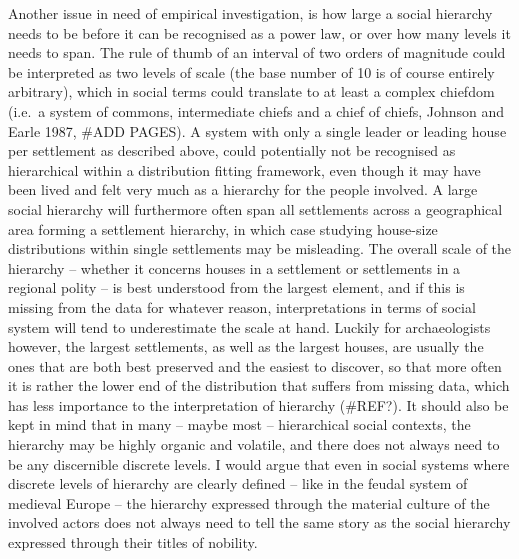 \documentclass[
  12pt,
]{book}
\begin{document}
Another issue in need of empirical investigation, is how large a social hierarchy needs to be before it can be recognised as a power law, or over how many levels it needs to span. The rule of thumb of an interval of two orders of magnitude could be interpreted as two levels of scale (the base number of 10 is of course entirely arbitrary), which in social terms could translate to at least a complex chiefdom (i.e.~a system of commons, intermediate chiefs and a chief of chiefs, Johnson and Earle 1987, \#ADD PAGES). A system with only a single leader or leading house per settlement as described above, could potentially not be recognised as hierarchical within a distribution fitting framework, even though it may have been lived and felt very much as a hierarchy for the people involved. A large social hierarchy will furthermore often span all settlements across a geographical area forming a settlement hierarchy, in which case studying house-size distributions within single settlements may be misleading. The overall scale of the hierarchy -- whether it concerns houses in a settlement or settlements in a regional polity -- is best understood from the largest element, and if this is missing from the data for whatever reason, interpretations in terms of social system will tend to underestimate the scale at hand. Luckily for archaeologists however, the largest settlements, as well as the largest houses, are usually the ones that are both best preserved and the easiest to discover, so that more often it is rather the lower end of the distribution that suffers from missing data, which has less importance to the interpretation of hierarchy (\#REF?). It should also be kept in mind that in many -- maybe most -- hierarchical social contexts, the hierarchy may be highly organic and volatile, and there does not always need to be any discernible discrete levels. I would argue that even in social systems where discrete levels of hierarchy are clearly defined -- like in the feudal system of medieval Europe -- the hierarchy expressed through the material culture of the involved actors does not always need to tell the same story as the social hierarchy expressed through their titles of nobility.
\end{document}
